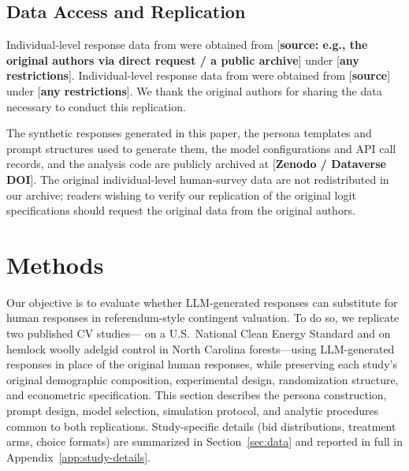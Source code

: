 \documentclass[12pt]{article}
\begin{document}
\subsection{Data Access and Replication}\label{sec:data-access}

Individual-level response data from \textcite{Aldy2012} were obtained from
[\textbf{source: e.g., the original authors via direct request / a public
archive}] under [\textbf{any restrictions}]. Individual-level response data
from \textcite{Giguere2020} were obtained from [\textbf{source}] under
[\textbf{any restrictions}]. We thank the original authors for sharing the
data necessary to conduct this replication.

The synthetic responses generated in this paper, the persona templates and
prompt structures used to generate them, the model configurations and API
call records, and the analysis code are publicly archived at
[\textbf{Zenodo / Dataverse DOI}]. The original individual-level
human-survey data are not redistributed in our archive; readers wishing
to verify our replication of the original logit specifications should
request the original data from the original authors.


%

\section{Methods}\label{sec:methods}

Our objective is to evaluate whether LLM-generated responses can substitute
for human responses in referendum-style contingent valuation. To do so, we
replicate two published CV studies---\textcite{Aldy2012} on a U.S.\ National
Clean Energy Standard and \textcite{Giguere2020} on hemlock woolly adelgid
control in North Carolina forests---using LLM-generated responses in place
of the original human responses, while preserving each study's original
demographic composition, experimental design, randomization structure, and
econometric specification. This section describes the persona construction,
prompt design, model selection, simulation protocol, and analytic procedures
common to both replications. Study-specific details (bid distributions,
treatment arms, choice formats) are summarized in Section~\ref{sec:data}
and reported in full in Appendix~\ref{app:study-details}.
\end{document}

